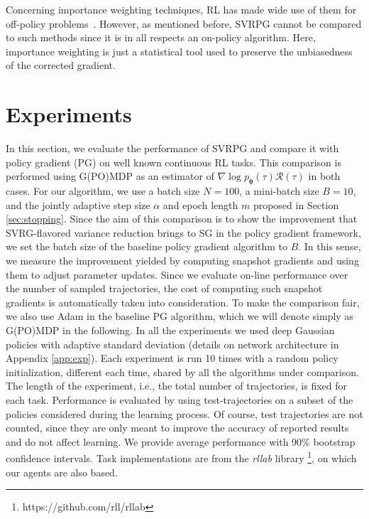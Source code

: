 \documentclass{article}
\makeatletter
\theoremstyle{remark}
\theoremstyle{definition}
\DeclareRobustCommand{\eg}{e.g.,\@\xspace}
\DeclareRobustCommand{\ie}{i.e.,\@\xspace}
\newcommand{\todopir}[1]{\todo[color=blued, inline]{\small #1}}
\newcommand{\vtheta}{\boldsymbol{\theta}}
\newcommand{\Reward}{\mathcal{R}}
\newcommand{\score}[2]{\nabla\log p_{#1}(#2)}
\makeatother
\begin{document}
Concerning importance weighting techniques, RL has made wide use of them for off-policy problems~\citep[\eg][]{precup2000eligibility,thomas2015high}. However, as mentioned before, SVRPG cannot be compared to such methods since it is in all respects an on-policy algorithm. Here, importance weighting is just a statistical tool used to preserve the unbiasedness of the corrected gradient.

\todopir{Maybe we can talk about variance reduction baselines}


\section{Experiments}\label{sec:exp}
In this section, we evaluate the performance of SVRPG and compare it with policy gradient (PG) on well known continuous RL tasks. This comparison is performed using G(PO)MDP as an estimator of $\score{\vtheta}{\tau}\Reward(\tau)$ in both cases. For our algorithm, we use a batch size $N=100$, a mini-batch size $B=10$, and the jointly adaptive step size $\alpha$ and epoch length $m$ proposed in Section \ref{sec:stopping}. Since the aim of this comparison is to show the improvement that SVRG-flavored variance reduction brings to SG in the policy gradient framework, we set the batch size of the baseline policy gradient algorithm to $B$. In this sense, we measure the improvement yielded by computing snapshot gradients and using them to adjust parameter updates. Since we evaluate on-line performance over the number of sampled trajectories, the cost of computing such snapshot gradients is automatically taken into consideration. To make the comparison fair, we also use Adam in the baseline PG algorithm, which we will denote simply as G(PO)MDP in the following.
In all the experiments we used deep Gaussian policies with adaptive standard deviation (details on network architecture in Appendix \ref{app:exp}). Each experiment is run 10 times with a random policy initialization, different each time, shared by all the algorithms under comparison. The length of the experiment, \ie the total number of trajectories, is fixed for each task. Performance is evaluated by using test-trajectories on a subset of the policies considered during the learning process. Of course, test trajectories are not counted, since they are only meant to improve the accuracy of reported results and do not affect learning. We provide average performance with 90\% bootstrap confidence intervals.  
Task implementations are from the \textit{rllab} library \cite{duan2016benchmarking}\footnote{https://github.com/rll/rllab}, on which our agents are also based.
\end{document}
